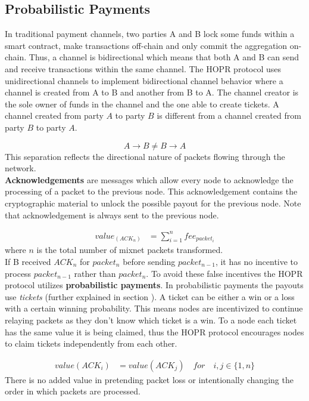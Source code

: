\subsection{Probabilistic Payments}

In traditional payment channels, two parties A and B lock some funds within a
smart contract, make transactions off-chain and only commit the aggregation
on-chain. Thus, a channel is bidirectional which means that both A and B can
send and receive transactions within the same channel. The HOPR protocol uses
unidirectional channels to implement bidirectional channel behavior where a channel is created from A to B and another from B to A. 
The channel creator is the sole owner of funds in the channel and the one able to create tickets. A channel created from
party $A$ to party $B$ is different from a channel created from party $B$ to
party $A$.

 $$A\rightarrow B \neq B\rightarrow A$$
This separation reflects the directional nature of packets flowing through the
network.
\\\textbf{Acknowledgements} are messages which allow every node to acknowledge the
processing of a packet to the previous node. This acknowledgement contains the
cryptographic material to unlock the possible payout for the previous node. Note
that acknowledgement is always sent to the previous node.

\begin{align}
value_(ACK_n) &=\sum_{i=1}^nfee_{packet_i}
\end{align}
where $n$ is the total number of mixnet packets transformed.
\\If B received $ACK_n$ for $packet_n$ before sending $packet_{n-1}$, it has no
incentive to process $packet_{n-1}$ rather than $packet_{n}$. To avoid these
false incentives the HOPR protocol utilizes \textbf{probabilistic payments}.
In probabilistic payments the payouts use \textit{tickets} (further explained in
section ). A ticket can be either a win or a loss with a
certain winning probability. This means nodes are incentivized to continue
relaying packets as they don’t know which ticket is a win. To a node each
ticket has the same value it is being claimed, thus the HOPR protocol
encourages nodes to claim tickets independently from each other.

\begin{align}
 value ( ACK_i )  &  =value ( ACK_j ) \quad for \quad i,j\in \{1,n\}
\end{align}
There is no added value in pretending packet loss or intentionally changing the order in which packets are processed.

